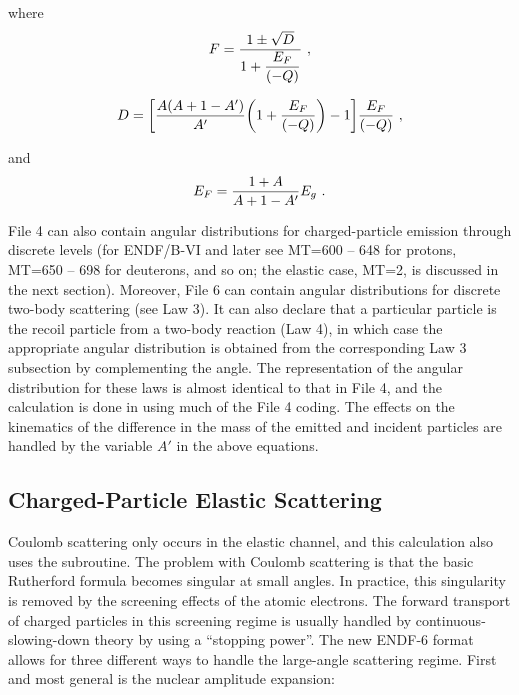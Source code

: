 \noindent
where
  \begin{equation}
    F={{1\pm\sqrt{D}}\over{1+ \displaystyle{{E_F}\over{(-Q)}} }}\,\,,
  \end{equation}
\vspace{0.5 pt}

  \begin{equation}
    D=\biggl[ \frac{A(A+1-A')}{A'}
       \biggl( 1+{{E_F}\over{(-Q)}} \biggr) -1 \biggr]
    {{E_F}\over{(-Q)}}\,\,,
  \end{equation}
\vspace{0.5 pt}

\noindent
and
  \begin{equation}
    E_F={{1+A}\over {A+1-A'}} E_g\,\,.
  \label{Eq82}
  \end{equation}

File 4 can also contain angular distributions for charged-particle
emission through discrete levels (for ENDF/B-VI and later see
MT=600 -- 648 for protons,
MT=650 -- 698 for deuterons, and so on; the elastic case, MT=2, is
discussed in the next section).  Moreover, File 6 can contain angular
distributions for discrete two-body scattering (see Law 3).  It can
also declare that a particular particle is the recoil particle
from a two-body reaction (Law 4), in which case the appropriate
angular distribution is obtained from the corresponding Law 3
subsection by complementing the angle.  The representation of the
angular distribution for these laws is almost identical to that
in File 4, and the calculation is done in
 using much
of the File 4 coding.  The effects on the kinematics of the difference
in the mass of the emitted and incident particles are handled by the
variable $A'$ in the above equations.

\subsection{Charged-Particle Elastic Scattering}
\label{ssGROUPR_CPEl}

Coulomb scattering only occurs in the
elastic channel, and this calculation also uses the
 subroutine.  The problem with Coulomb scattering
is that the basic Rutherford formula
becomes singular at small angles.  In practice, this singularity
is removed by the screening effects of the atomic electrons.
  The forward transport of charged
particles in this screening regime is usually handled by
continuous-slowing-down theory by using a ``stopping power''.
The new ENDF-6 format allows for three different ways to handle the
large-angle scattering regime.  First and most general is the nuclear
amplitude expansion:


